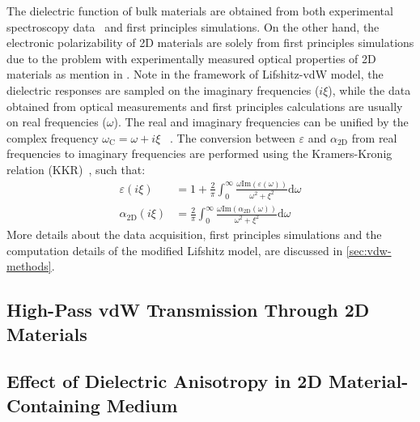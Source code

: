 The dielectric function of bulk materials are obtained from both
experimental spectroscopy data~\cite{Palik_1998_handbook} and first
principles simulations.
%
On the other hand, the electronic polarizability of 2D
materials are solely from first principles simulations due to the
problem with experimentally measured optical properties of 2D
materials as mention in .
%
Note in the framework of Lifshitz-vdW model, the dielectric responses
are sampled on the imaginary frequencies ($i\xi$), while the data
obtained from optical measurements and first principles calculations
are usually on real frequencies ($\omega$). The real and imaginary
frequencies can be unified by the complex frequency
$\omega_{\mathrm{C}} = \omega + i\xi$~\cite{parsegian_van_2010_book}
.
%
The conversion between $\varepsilon$ and $\alpha_{\mathrm{2D}}$ from
real frequencies to imaginary frequencies are performed using the
Kramers-Kronig relation (KKR)~\cite{Roessler_1965_KKR}, such that:
\begin{eqnarray}
  \label{eq:vdw-KKR-eps}
  \varepsilon(i\xi) &= 1 + {\displaystyle \frac{2}{\pi}}{\displaystyle \int_{0}^{\infty}} {\displaystyle \frac{\omega \mathrm{Im}(\varepsilon(\omega))}{\omega^{2} + \xi^{2}}} \mathrm{d}\omega \\
  \label{eq:vdw-KKR-alpha}
  \alpha_{\mathrm{2D}}(i\xi) &= {\displaystyle \frac{2}{\pi}} {\displaystyle \int_{0}^{\infty}} {\displaystyle \frac{\omega \mathrm{Im}(\alpha_{\mathrm{2D}}(\omega))}{\omega^{2} + \xi^{2}}} \mathrm{d}\omega
\end{eqnarray}
%
More details about the data acquisition, first principles simulations
and the computation details of the modified Lifshitz model, are
discussed in \autoref{sec:vdw-methods}.   


\subsection{High-Pass vdW Transmission Through 2D Materials}
\label{sec:vdw-high-pass-vdw}

\subsection{Effect of Dielectric Anisotropy in 2D Material-Containing Medium}
\label{sec:vdw-effect-diel-anis}

